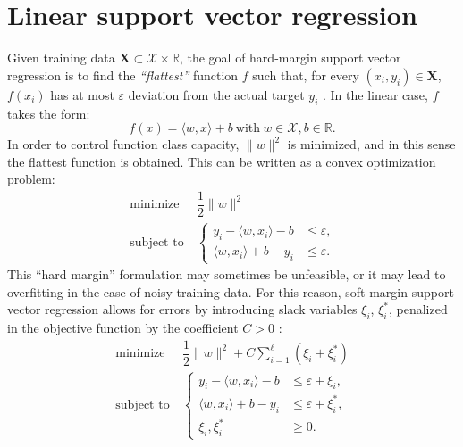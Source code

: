 \documentclass[12pt]{report}
\begin{document}
\section{Linear support vector regression}
Given training data $ \mathbf{X} \subset \mathcal{X} \times \mathbb{R} $, the goal of hard-margin support vector regression is to find the \textit{``flattest''} function $ f $ such that, for every $ (x_{i},y_{i}) \in \mathbf{X} $, $ f(x_{i}) $ has at most $ \varepsilon $ deviation from the actual target $ y_{i} $ \cite{vapnik95}. In the linear case, $ f $ takes the form:
\begin{equation} \label{linfun}
f(x) = \langle w,x \rangle + b \ \text{with} \ w \in \mathcal{X}, b \in \mathbb{R} \text{.}
\end{equation}
In order to control function class capacity, $ \| w \|^2 $ is minimized, and in this sense the flattest function is obtained. This can be written as a convex optimization problem:
\begin{equation} \label{hmargprimal}
\begin{split}
\text{minimize} &\ \dfrac{1}{2}\| w \|^2 \\
\text{subject to} &\ \begin{cases}
y_{i} - \langle w,x_{i} \rangle - b &\leq \varepsilon \text{,}\\
\langle w,x_{i} \rangle + b - y_{i} &\leq \varepsilon \text{.}
\end{cases}
\end{split}
\end{equation}
This ``hard margin'' formulation may sometimes be unfeasible, or it may lead to overfitting in the case of noisy training data. For this reason, soft-margin support vector regression allows for errors by introducing slack variables $ \xi_{i} $, $ \xi_{i}^{*} $, penalized in the objective function by the coefficient $ C > 0 $ \cite{cortes95}:
\begin{equation} \label{smargprimal}
\begin{split}
\text{minimize} &\ \dfrac{1}{2}\| w \|^2 + C\sum_{i=1}^{\ell}(\xi_{i} + \xi_{i}^{*}) \\
\text{subject to} &\ \begin{cases}
y_{i} - \langle w,x_{i} \rangle - b &\leq \varepsilon + \xi_{i} \text{,}\\
\langle w,x_{i} \rangle + b - y_{i} &\leq \varepsilon + \xi_{i}^{*} \text{,}\\
\xi_{i}, \xi_{i}^{*} &\geq 0 \text{.}
\end{cases}
\end{split}
\end{equation}
\end{document}
